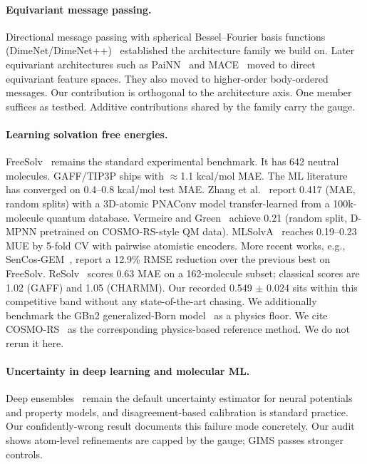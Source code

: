 \documentclass{article}
\begin{document}
\paragraph{Equivariant message passing.} Directional message passing with
spherical Bessel--Fourier basis functions (DimeNet/DimeNet++)~\cite{klicpera2020}
established the architecture family we build on. Later equivariant
architectures such as PaiNN~\cite{schutt2021} and
MACE~\cite{batatia2022} moved to direct equivariant feature spaces. They also
moved to higher-order body-ordered messages. Our contribution is orthogonal to the architecture axis. One member suffices as testbed.
Additive contributions shared by the family carry the gauge.

\paragraph{Learning solvation free energies.} FreeSolv~\cite{mobley2014freesolv}
remains the standard experimental benchmark. It has 642 neutral molecules.
GAFF/TIP3P ships with $\approx$1.1 kcal/mol MAE. The ML literature has converged on
0.4--0.8 kcal/mol test MAE. Zhang et al.~\cite{zhang2022} report 0.417
(MAE, random splits) with a 3D-atomic PNAConv model transfer-learned from a
100k-molecule quantum database. Vermeire and Green~\cite{vermeire2021}
achieve 0.21 (random split, D-MPNN pretrained on COSMO-RS-style QM data).
MLSolvA~\cite{lim2021} reaches 0.19--0.23 MUE by 5-fold CV with pairwise
atomistic encoders. More recent works, e.g., SenCos-GEM~\cite{sencosgem2026},
report a 12.9\% RMSE reduction over the previous best on FreeSolv.
ReSolv~\cite{roeckens2024} scores 0.63 MAE on a 162-molecule subset; classical scores are 1.02 (GAFF) and 1.05 (CHARMM). Our recorded
0.549 $\pm$ 0.024 sits within this competitive band without any
state-of-the-art chasing. We additionally benchmark the GBn2 generalized-Born
model~\cite{mongan2007} as a physics floor. We cite
COSMO-RS~\cite{klamt1995} as the corresponding physics-based reference
method. We do not rerun it here.

\paragraph{Uncertainty in deep learning and molecular ML.} Deep
ensembles~\cite{lakshminarayanan2017} remain the default uncertainty
estimator for neural potentials and property models, and disagreement-based
calibration is standard practice. Our confidently-wrong result documents this failure mode concretely. Our audit shows atom-level refinements are capped by the gauge; GIMS passes stronger controls.
\end{document}
